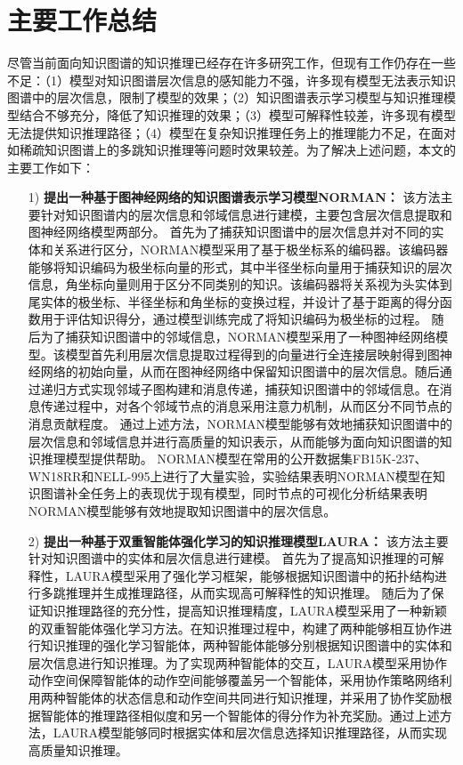 \documentclass[algorithmlist, AutoFakeBold, AutoFakeSlant, figurelist, tablelist, nomlist, engineering]{seuthesix}
\begin{document}
\section{主要工作总结}
尽管当前面向知识图谱的知识推理已经存在许多研究工作，但现有工作仍存在一些不足：（1）模型对知识图谱层次信息的感知能力不强，许多现有模型无法表示知识图谱中的层次信息，限制了模型的效果；（2）知识图谱表示学习模型与知识推理模型结合不够充分，降低了知识推理的效果；（3）模型可解释性较差，许多现有模型无法提供知识推理路径；（4）模型在复杂知识推理任务上的推理能力不足，在面对如稀疏知识图谱上的多跳知识推理等问题时效果较差。为了解决上述问题，本文的主要工作如下：
\begin{itemize}
  \item [1)]\textbf{提出一种基于图神经网络的知识图谱表示学习模型NORMAN：}
  该方法主要针对知识图谱内的层次信息和邻域信息进行建模，主要包含层次信息提取和图神经网络模型两部分。
  首先为了捕获知识图谱中的层次信息并对不同的实体和关系进行区分，NORMAN模型采用了基于极坐标系的编码器。该编码器能够将知识编码为极坐标向量的形式，其中半径坐标向量用于捕获知识的层次信息，角坐标向量则用于区分不同类别的知识。该编码器将关系视为头实体到尾实体的极坐标、半径坐标和角坐标的变换过程，并设计了基于距离的得分函数用于评估知识得分，通过模型训练完成了将知识编码为极坐标的过程。
  随后为了捕获知识图谱中的邻域信息，NORMAN模型采用了一种图神经网络模型。该模型首先利用层次信息提取过程得到的向量进行全连接层映射得到图神经网络的初始向量，从而在图神经网络中保留知识图谱中的层次信息。随后通过递归方式实现邻域子图构建和消息传递，捕获知识图谱中的邻域信息。在消息传递过程中，对各个邻域节点的消息采用注意力机制，从而区分不同节点的消息贡献程度。
  通过上述方法，NORMAN模型能够有效地捕获知识图谱中的层次信息和邻域信息并进行高质量的知识表示，从而能够为面向知识图谱的知识推理模型提供帮助。
  NORMAN模型在常用的公开数据集FB15K-237、WN18RR和NELL-995上进行了大量实验，实验结果表明NORMAN模型在知识图谱补全任务上的表现优于现有模型，同时节点的可视化分析结果表明NORMAN模型能够有效地提取知识图谱中的层次信息。
  \item [2)]\textbf{提出一种基于双重智能体强化学习的知识推理模型LAURA：}
  该方法主要针对知识图谱中的实体和层次信息进行建模。
  首先为了提高知识推理的可解释性，LAURA模型采用了强化学习框架，能够根据知识图谱中的拓扑结构进行多跳推理并生成推理路径，从而实现高可解释性的知识推理。
  随后为了保证知识推理路径的充分性，提高知识推理精度，LAURA模型采用了一种新颖的双重智能体强化学习方法。在知识推理过程中，构建了两种能够相互协作进行知识推理的强化学习智能体，两种智能体能够分别根据知识图谱中的实体和层次信息进行知识推理。为了实现两种智能体的交互，LAURA模型采用协作动作空间保障智能体的动作空间能够覆盖另一个智能体，采用协作策略网络利用两种智能体的状态信息和动作空间共同进行知识推理，并采用了协作奖励根据智能体的推理路径相似度和另一个智能体的得分作为补充奖励。通过上述方法，LAURA模型能够同时根据实体和层次信息选择知识推理路径，从而实现高质量知识推理。

\end{itemize}
\end{document}
